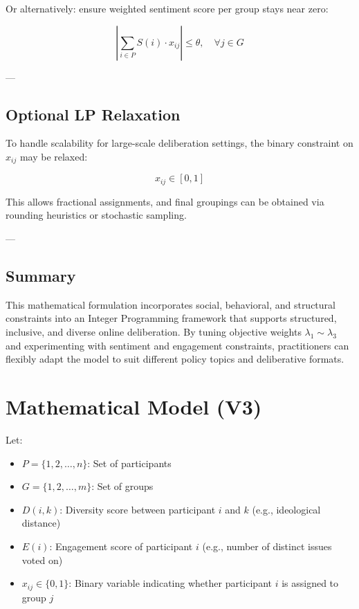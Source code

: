 \documentclass[11pt,a4paper]{article}
\begin{document}
Or alternatively: ensure weighted sentiment score per group stays near zero:

$$
\left| \sum_{i \in P} S(i) \cdot x_{ij} \right| \leq \theta, \quad \forall j \in G
$$

---

\subsection{Optional LP Relaxation}

To handle scalability for large-scale deliberation settings, the binary constraint on $x_{ij}$ may be relaxed:

$$
x_{ij} \in [0,1]
$$

This allows fractional assignments, and final groupings can be obtained via rounding heuristics or stochastic sampling.

---

\subsection{Summary}

This mathematical formulation incorporates social, behavioral, and structural constraints into an Integer Programming framework that supports structured, inclusive, and diverse online deliberation. By tuning objective weights $\lambda_1 \sim \lambda_3$ and experimenting with sentiment and engagement constraints, practitioners can flexibly adapt the model to suit different policy topics and deliberative formats.


\section{Mathematical Model (V3)}
\label{sec-model}

Let:
\begin{itemize}
    \item $P = \{1, 2, \dots, n\}$: Set of participants
    \item $G = \{1, 2, \dots, m\}$: Set of groups
    \item $D(i,k)$: Diversity score between participant $i$ and $k$ (e.g., ideological distance)
    \item $E(i)$: Engagement score of participant $i$ (e.g., number of distinct issues voted on)
    \item $x_{ij} \in \{0,1\}$: Binary variable indicating whether participant $i$ is assigned to group $j$
\end{itemize}
\end{document}
